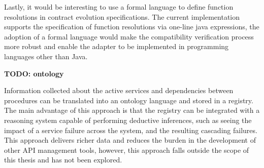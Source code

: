 Lastly, it would be interesting to use a formal language to define function resolutions in contract evolution specifications.
The current implementation supports the specification of function resolutions via one-line java expressions,
the adoption of a formal language would make the compatibility verification process more robust and enable the adapter to be implemented in programming languages other than Java.

\textbf{TODO: ontology}

Information collected about the active services and dependencies between
procedures can be translated into an ontology language and stored in a registry. The main
advantage of this approach is that the registry can be integrated with a reasoning system
capable of performing deductive inferences, such as seeing the impact of a service failure
across the system, and the resulting cascading failures. This approach delivers richer data
and reduces the burden in the development of other API management tools, however,
this approach falls outside the scope of this thesis and has not been explored.


